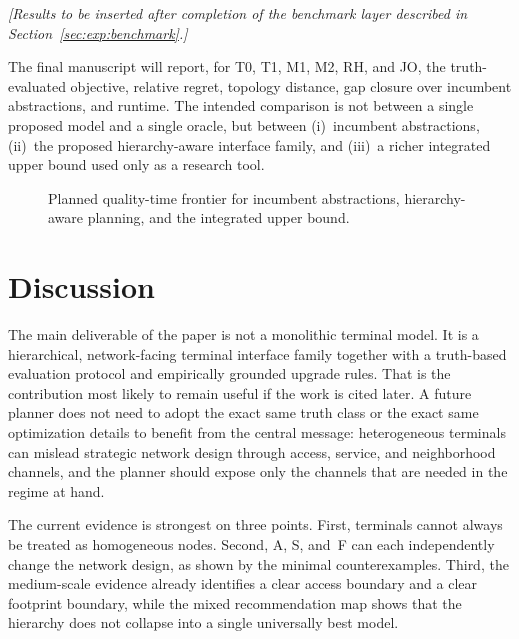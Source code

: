 \documentclass[review,authoryear]{elsarticle}
\begin{document}
\textit{[Results to be inserted after completion of the benchmark layer described in Section~\ref{sec:exp:benchmark}.]}

The final manuscript will report, for T0, T1, M1, M2, RH, and JO, the truth-evaluated objective, relative regret, topology distance, gap closure over incumbent abstractions, and runtime. The intended comparison is not between a single proposed model and a single oracle, but between (i)~incumbent abstractions, (ii)~the proposed hierarchy-aware interface family, and (iii)~a richer integrated upper bound used only as a research tool.

\begin{figure}[htbp]
  \centering
  \caption{Planned quality-time frontier for incumbent abstractions, hierarchy-aware planning, and the integrated upper bound.}
  \label{fig:frontier}
\end{figure}


\section{Discussion}
\label{sec:discussion}

The main deliverable of the paper is not a monolithic terminal model. It is a hierarchical, network-facing terminal interface family together with a truth-based evaluation protocol and empirically grounded upgrade rules. That is the contribution most likely to remain useful if the work is cited later. A future planner does not need to adopt the exact same truth class or the exact same optimization details to benefit from the central message: heterogeneous terminals can mislead strategic network design through access, service, and neighborhood channels, and the planner should expose only the channels that are needed in the regime at hand.

The current evidence is strongest on three points. First, terminals cannot always be treated as homogeneous nodes. Second, A, S, and~F can each independently change the network design, as shown by the minimal counterexamples. Third, the medium-scale evidence already identifies a clear access boundary and a clear footprint boundary, while the mixed recommendation map shows that the hierarchy does not collapse into a single universally best model.
\end{document}
